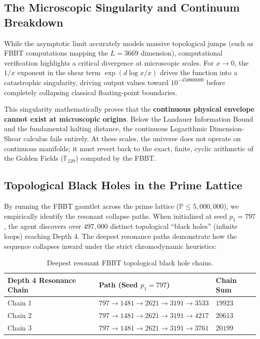 \documentclass[12pt,oneside]{article}
\theoremstyle{principia}
\theoremstyle{definition}
\theoremstyle{remark}
\begin{document}
\subsection{The Microscopic Singularity and Continuum Breakdown}
While the asymptotic limit accurately models massive topological jumps (such as FBBT computations mapping the $L=3669$ dimension), computational verification highlights a critical divergence at microscopic scales. For $x \to 0$, the $1/x$ exponent in the shear term $\exp(d \log x / x)$ drives the function into a catastrophic singularity, driving output values toward $10^{-450000000}$ before completely collapsing classical floating-point boundaries.

This singularity mathematically proves that the \textbf{continuous physical envelope cannot exist at microscopic origins}. Below the Landauer Information Bound and the fundamental halting distance, the continuous Logarithmic Dimension-Shear calculus fails entirely. At these scales, the universe does not operate on continuous manifolds; it must revert back to the exact, finite, cyclic arithmetic of the Golden Fields ($\mathbb{F}_{229}$) computed by the FBBT.

\subsection{Topological Black Holes in the Prime Lattice}
By running the FBBT gauntlet across the prime lattice ($\mathbb{P} \le 5,000,000$), we empirically identify the resonant collapse paths. When initialized at seed $p_1 = 797$, the agent discovers over $497,000$ distinct topological ``black holes'' (infinite loops) reaching Depth 4. 
The deepest resonance paths demonstrate how the sequence collapses inward under the strict chromodynamic heuristics:

\begin{table}[ht]
\centering
\begin{tabular}{|l|l|l|}
\hline
\textbf{Depth 4 Resonance Chain} & \textbf{Path (Seed $p_1 = 797$)} & \textbf{Chain Sum} \\
\hline
Chain 1 & $797 \to 1481 \to 2621 \to 3191 \to 3533$ & $19923$ \\
Chain 2 & $797 \to 1481 \to 2621 \to 3191 \to 4217$ & $20613$ \\
Chain 3 & $797 \to 1481 \to 2621 \to 3191 \to 3761$ & $20199$ \\
\hline
\end{tabular}
\caption{Deepest resonant FBBT topological black hole chains.}
\label{tab:fbbt_blackholes}
\end{table}
\end{document}
